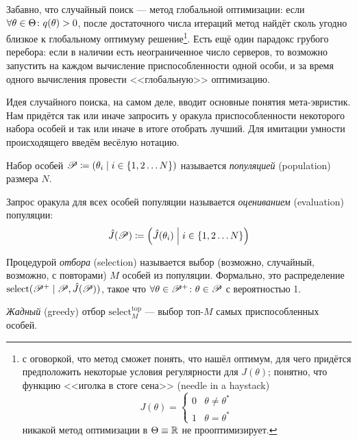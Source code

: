 Забавно, что случайный поиск --- метод глобальной оптимизации: если $\forall \theta \HM\in \Theta \colon q(\theta) \HM> 0$, после достаточного числа итераций метод найдёт сколь угодно близкое к глобальному оптимуму решение\footnote{с оговоркой, что метод сможет понять, что нашёл оптимум, для чего придётся предположить некоторые условия регулярности для $J(\theta)$; понятно, что функцию <<иголка в стоге сена>> (needle in a haystack)
$$J(\theta) = \begin{cases}0 & \theta \neq \theta^* \\ 1 & \theta = \theta^*\end{cases}$$ никакой метод оптимизации в $\Theta \equiv \mathbb{R}$ не прооптимизирует.}. Есть ещё один парадокс грубого перебора: если в наличии есть неограниченное число серверов, то возможно запустить на каждом вычисление приспособленности одной особи, и за время одного вычисления провести <<глобальную>> оптимизацию.

Идея случайного поиска, на самом деле, вводит основные понятия мета-эвристик. Нам придётся так или иначе запросить у оракула приспособленности некоторого набора особей и так или иначе в итоге отобрать лучший. Для имитации умности происходящего введём весёлую нотацию.

\begin{definition}
Набор особей $\mathscr{P} \coloneqq \left( \theta_i \mid i \in \{1, 2 \dots N\} \right) $ называется \emph{популяцией} (population) размера $N$.
\end{definition}

\begin{definition}
Запрос оракула для всех особей популяции называется \emph{оцениванием} (evaluation) популяции:
$$\hat{J}(\mathscr{P}) \coloneqq \left( \hat{J}(\theta_i) \Bigm| i \in \{1, 2 \dots N\} \right)$$
\end{definition}

\newcommand{\Sel}{\mathrm{select}}
\begin{definition}
Процедурой \emph{отбора} (selection) называется выбор (возможно, случайный, возможно, с повторами) $M$ особей из популяции. Формально, это распределение $\Sel(\Pop^+ \mid \Pop, \hat{J}(\Pop))$, такое что $\forall \theta \in \mathscr{P}^+ \colon \theta \in \mathscr{P}$ с вероятностью 1.
\end{definition}

\newcommand{\Seltop}{\Sel^{\mathop{top}}}
\begin{definition}
\emph{Жадный} (greedy) отбор $\Seltop_M$ --- выбор топ-$M$ самых приспособленных особей.
\end{definition}

